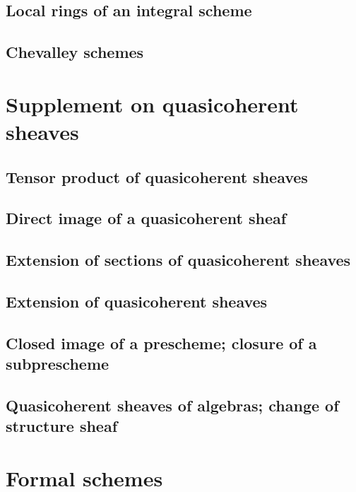         \subsection{Local rings of an integral scheme}
        

        \subsection{Chevalley schemes}
        

    \section{Supplement on quasicoherent sheaves}

        \subsection{Tensor product of quasicoherent sheaves}
        

        \subsection{Direct image of a quasicoherent sheaf}
        
        
        \subsection{Extension of sections of quasicoherent sheaves}
        
        
        \subsection{Extension of quasicoherent sheaves}
        
        
        \subsection{Closed image of a prescheme; closure of a subprescheme}
        
        
        \subsection{Quasicoherent sheaves of algebras; change of structure sheaf}
        
        
    \section{Formal schemes}

